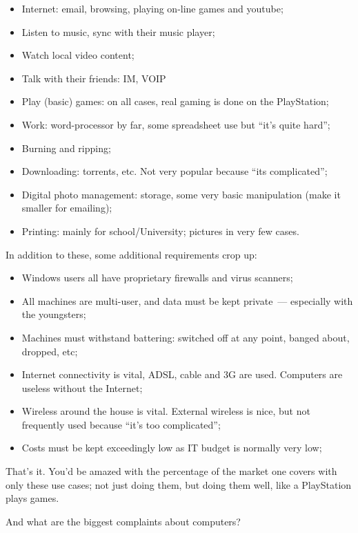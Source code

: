 \documentclass{book}
\begin{document}
\begin{itemize}
\item Internet: email, browsing, playing on-line games and youtube;
\item Listen to music, sync with their music player;
\item Watch local video content;
\item Talk with their friends: IM, VOIP
\item Play (basic) games: on all cases, real gaming is done on the
  PlayStation;
\item Work: word-processor by far, some spreadsheet use but ``it's
  quite hard'';
\item Burning and ripping;
\item Downloading: torrents, etc. Not very popular because ``its
  complicated'';
\item Digital photo management: storage, some very basic manipulation
  (make it smaller for emailing);
\item Printing: mainly for school/University; pictures in very few
  cases.
\end{itemize}

In addition to these, some additional requirements crop up:

\begin{itemize}
\item Windows users all have proprietary firewalls and virus scanners;
\item All machines are multi-user, and data must be kept private~---
  especially with the youngsters;
\item Machines must withstand battering: switched off at any point,
  banged about, dropped, etc;
\item Internet connectivity is vital, ADSL, cable and 3G are
  used. Computers are useless without the Internet;
\item Wireless around the house is vital. External wireless is nice,
  but not frequently used because ``it's too complicated'';
\item Costs must be kept exceedingly low as IT budget is normally very
  low;
\end{itemize}

That's it. You'd be amazed with the percentage of the market one
covers with only these use cases; not just doing them, but doing them
well, like a PlayStation plays games.

And what are the biggest complaints about computers?
\end{document}
